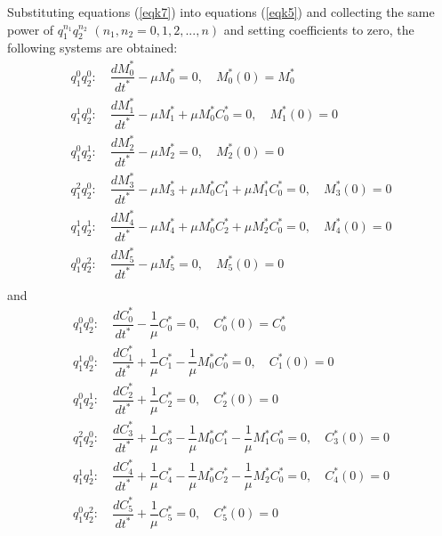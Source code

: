 \documentclass[a4paper,12pt]{article}
\begin{document}
\noindent Substituting equations (\ref{eqk7}) into equations (\ref{eqk5}) and collecting the same power of $q_{1}^{n_{1}}q_{2}^{n_{2}}$ $(n_{1},n_{2}=0,1,2,...,n)$ and setting coefficients to zero, the following systems are obtained:
\begin{equation}  
\begin{array}{llll}
q_{1}^{0}q_{2}^{0}:\quad \dfrac{dM^{*}_{0}}{dt^{*}}- \mu M^{*}_{0}=0, \quad M^{*}_{0}(0)=M^{*}_{0} \\
q_{1}^{1}q_{2}^{0}:\quad \dfrac{dM^{*}_{1}}{dt^{*}}-\mu M^{*}_{1}+\mu M^{*}_{0} C^{*}_{0}=0, \quad M^{*}_{1}(0)=0 \\
q_{1}^{0}q_{2}^{1}:\quad \dfrac{dM^{*}_{2}}{dt^{*}}-\mu M^{*}_{2}=0, \quad M^{*}_{2}(0)=0 \\
q_{1}^{2}q_{2}^{0}:\quad \dfrac{dM^{*}_{3}}{dt^{*}}-\mu M^{*}_{3}+\mu M^{*}_{0} C^{*}_{1}+\mu M^{*}_{1} C^{*}_{0}=0, \quad M^{*}_{3}(0)=0 \\
q_{1}^{1}q_{2}^{1}:\quad \dfrac{dM^{*}_{4}}{dt^{*}}-\mu M^{*}_{4}+\mu M^{*}_{0} C^{*}_{2}+\mu M^{*}_{2} C^{*}_{0}=0, \quad M^{*}_{4}(0)=0 \\
q_{1}^{0}q_{2}^{2}:\quad \dfrac{dM^{*}_{5}}{dt^{*}}-\mu M^{*}_{5}=0, \quad M^{*}_{5}(0)=0 \\
\end{array}\label{eqk8} 
\end{equation}
and
\begin{equation}  
\begin{array}{llll}
q_{1}^{0}q_{2}^{0}:\quad \dfrac{dC^{*}_{0}}{dt^{*}}- \dfrac{1}{\mu} C^{*}_{0}=0, \quad C^{*}_{0}(0)=C^{*}_{0} \\
q_{1}^{1}q_{2}^{0}:\quad \dfrac{dC^{*}_{1}}{dt^{*}}+\dfrac{1}{\mu} C^{*}_{1}-\dfrac{1}{\mu} M^{*}_{0} C^{*}_{0}=0, \quad C^{*}_{1}(0)=0 \\
q_{1}^{0}q_{2}^{1}:\quad  \dfrac{dC^{*}_{2}}{dt^{*}}+\dfrac{1}{\mu} C^{*}_{2}=0, \quad C^{*}_{2}(0)=0\\
q_{1}^{2}q_{2}^{0}:\quad  \dfrac{dC^{*}_{3}}{dt^{*}}+\dfrac{1}{\mu} C^{*}_{3}-\dfrac{1}{\mu} M^{*}_{0} C^{*}_{1}-\dfrac{1}{\mu} M^{*}_{1} C^{*}_{0}=0, \quad C^{*}_{3}(0)=0 \\
q_{1}^{1}q_{2}^{1}:\quad \dfrac{dC^{*}_{4}}{dt^{*}}+\dfrac{1}{\mu} C^{*}_{4}-\dfrac{1}{\mu} M^{*}_{0} C^{*}_{2}-\dfrac{1}{\mu} M^{*}_{2} C^{*}_{0}=0, \quad C^{*}_{4}(0)=0\\
q_{1}^{0}q_{2}^{2}:\quad \dfrac{dC^{*}_{5}}{dt^{*}}+\dfrac{1}{\mu} C^{*}_{5}=0, \quad C^{*}_{5}(0)=0\\
\end{array}\label{eqk9}     
\end{equation}
\end{document}
